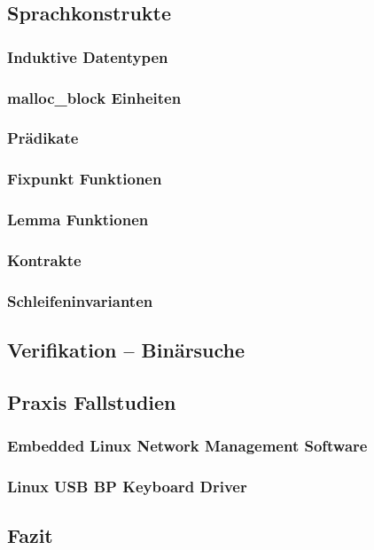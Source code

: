 \subsection{Sprachkonstrukte}

\subsubsection{Induktive Datentypen}

\subsubsection{malloc\_block Einheiten}

\subsubsection{Prädikate}

\subsubsection{Fixpunkt Funktionen}

\subsubsection{Lemma Funktionen}

\subsubsection{Kontrakte}

\subsubsection{Schleifeninvarianten}

\subsection{Verifikation -- Binärsuche}

\subsection{Praxis Fallstudien}

\subsubsection{Embedded Linux Network Management Software}

\subsubsection{Linux USB BP Keyboard Driver}

\subsection{Fazit}